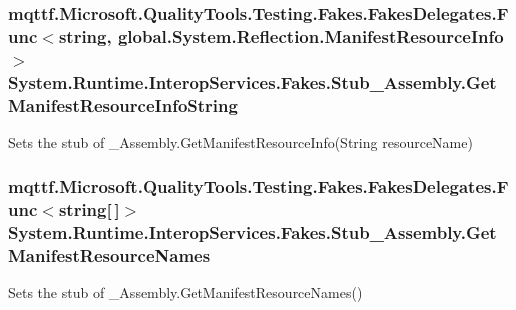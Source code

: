 \hypertarget{class_system_1_1_runtime_1_1_interop_services_1_1_fakes_1_1_stub___assembly_a1b7f72a0ffd28ea891c95df8765fbcad}{
\subsubsection[{Get\-Manifest\-Resource\-Info\-String}]{\setlength{\rightskip}{0pt plus 5cm}mqttf.\-Microsoft.\-Quality\-Tools.\-Testing.\-Fakes.\-Fakes\-Delegates.\-Func$<$string, global.\-System.\-Reflection.\-Manifest\-Resource\-Info$>$ System.\-Runtime.\-Interop\-Services.\-Fakes.\-Stub\-\_\-\-Assembly.\-Get\-Manifest\-Resource\-Info\-String}}\label{class_system_1_1_runtime_1_1_interop_services_1_1_fakes_1_1_stub___assembly_a1b7f72a0ffd28ea891c95df8765fbcad}


Sets the stub of \-\_\-\-Assembly.\-Get\-Manifest\-Resource\-Info(\-String resource\-Name)

\hypertarget{class_system_1_1_runtime_1_1_interop_services_1_1_fakes_1_1_stub___assembly_aee027cba18fedb7d65b4028bc00de59e}{
\subsubsection[{Get\-Manifest\-Resource\-Names}]{\setlength{\rightskip}{0pt plus 5cm}mqttf.\-Microsoft.\-Quality\-Tools.\-Testing.\-Fakes.\-Fakes\-Delegates.\-Func$<$string\mbox{[}$\,$\mbox{]}$>$ System.\-Runtime.\-Interop\-Services.\-Fakes.\-Stub\-\_\-\-Assembly.\-Get\-Manifest\-Resource\-Names}}\label{class_system_1_1_runtime_1_1_interop_services_1_1_fakes_1_1_stub___assembly_aee027cba18fedb7d65b4028bc00de59e}


Sets the stub of \-\_\-\-Assembly.\-Get\-Manifest\-Resource\-Names()

